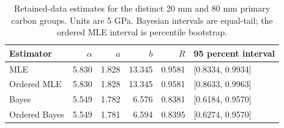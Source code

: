 \begin{table}[htbp]
\centering
\caption{Retained-data estimates for the distinct 20 mm and 80 mm primary carbon groups. Units are 5 GPa. Bayesian intervals are equal-tail; the ordered MLE interval is percentile bootstrap.}\label{tab:primary-estimates}
\small
\begin{tabular}{lrrrrl}
\toprule
Estimator & $\alpha$ & $a$ & $b$ & $R$ & 95 percent interval \\
\midrule
MLE & 5.830 & 1.828 & 13.345 & 0.9581 & [0.8334, 0.9934] \\
Ordered MLE & 5.830 & 1.828 & 13.345 & 0.9581 & [0.8633, 0.9963] \\
Bayes & 5.549 & 1.782 & 6.576 & 0.8381 & [0.6184, 0.9570] \\
Ordered Bayes & 5.549 & 1.781 & 6.594 & 0.8395 & [0.6274, 0.9570] \\
\bottomrule
\end{tabular}
\end{table}

